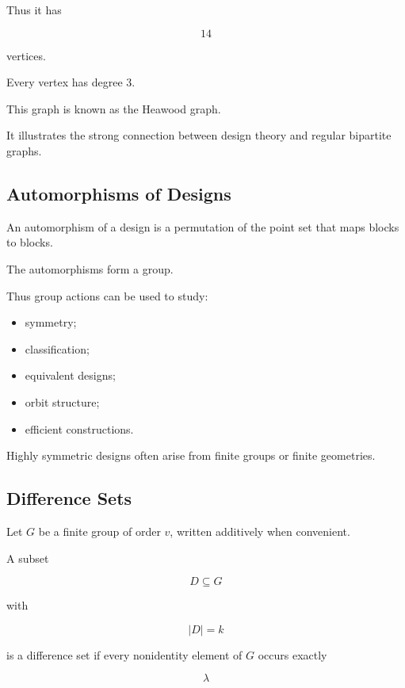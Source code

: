 Thus it has

\[
14
\]

vertices.

Every vertex has degree \(3\).

This graph is known as the Heawood graph.

It illustrates the strong connection between design theory and regular
bipartite graphs.

\subsection{Automorphisms of Designs}
\label{subsec:design-automorphisms}

An automorphism of a design is a permutation of the point set that maps
blocks to blocks.

The automorphisms form a group.

Thus group actions can be used to study:

\begin{itemize}
    \item symmetry;
    \item classification;
    \item equivalent designs;
    \item orbit structure;
    \item efficient constructions.
\end{itemize}

Highly symmetric designs often arise from finite groups or finite
geometries.

\subsection{Difference Sets}
\label{subsec:difference-sets}

Let \(G\) be a finite group of order \(v\), written additively when
convenient.

A subset

\[
D\subseteq G
\]

with

\[
|D|=k
\]

is a difference set if every nonidentity element of \(G\) occurs exactly

\[
\lambda
\]

